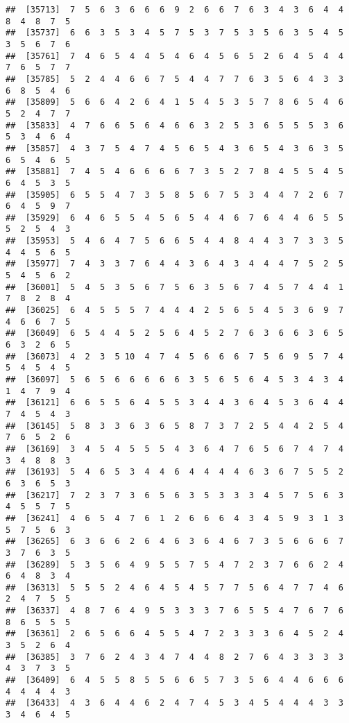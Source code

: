 \documentclass[
]{book}
\begin{document}
\begin{verbatim}
##  [35713]  7  5  6  3  6  6  6  9  2  6  6  7  6  3  4  3  6  4  4  8  4  8  7  5
##  [35737]  6  6  3  5  3  4  5  7  5  3  7  5  3  5  6  3  5  4  5  3  5  6  7  6
##  [35761]  7  4  6  5  4  4  5  4  6  4  5  6  5  2  6  4  5  4  4  7  6  5  7  7
##  [35785]  5  2  4  4  6  6  7  5  4  4  7  7  6  3  5  6  4  3  3  6  8  5  4  6
##  [35809]  5  6  6  4  2  6  4  1  5  4  5  3  5  7  8  6  5  4  6  5  2  4  7  7
##  [35833]  4  7  6  6  5  6  4  6  6  3  2  5  3  6  5  5  5  3  6  5  3  4  6  4
##  [35857]  4  3  7  5  4  7  4  5  6  5  4  3  6  5  4  3  6  3  5  6  5  4  6  5
##  [35881]  7  4  5  4  6  6  6  6  7  3  5  2  7  8  4  5  5  4  5  6  4  5  3  5
##  [35905]  6  5  5  4  7  3  5  8  5  6  7  5  3  4  4  7  2  6  7  6  4  5  9  7
##  [35929]  6  4  6  5  5  4  5  6  5  4  4  6  7  6  4  4  6  5  5  5  2  5  4  3
##  [35953]  5  4  6  4  7  5  6  6  5  4  4  8  4  4  3  7  3  3  5  4  4  5  6  5
##  [35977]  7  4  3  3  7  6  4  4  3  6  4  3  4  4  4  7  5  2  5  5  4  5  6  2
##  [36001]  5  4  5  3  5  6  7  5  6  3  5  6  7  4  5  7  4  4  1  7  8  2  8  4
##  [36025]  6  4  5  5  5  7  4  4  4  2  5  6  5  4  5  3  6  9  7  4  6  6  7  5
##  [36049]  6  5  4  4  5  2  5  6  4  5  2  7  6  3  6  6  3  6  5  6  3  2  6  5
##  [36073]  4  2  3  5 10  4  7  4  5  6  6  6  7  5  6  9  5  7  4  5  4  5  4  5
##  [36097]  5  6  5  6  6  6  6  6  3  5  6  5  6  4  5  3  4  3  4  1  4  7  9  4
##  [36121]  6  6  5  5  6  4  5  5  3  4  4  3  6  4  5  3  6  4  4  7  4  5  4  3
##  [36145]  5  8  3  3  6  3  6  5  8  7  3  7  2  5  4  4  2  5  4  7  6  5  2  6
##  [36169]  3  4  5  4  5  5  5  4  3  6  4  7  6  5  6  7  4  7  4  3  4  8  8  3
##  [36193]  5  4  6  5  3  4  4  6  4  4  4  4  6  3  6  7  5  5  2  6  3  6  5  3
##  [36217]  7  2  3  7  3  6  5  6  3  5  3  3  3  4  5  7  5  6  3  4  5  5  7  5
##  [36241]  4  6  5  4  7  6  1  2  6  6  6  4  3  4  5  9  3  1  3  5  7  5  6  3
##  [36265]  6  3  6  6  2  6  4  6  3  6  4  6  7  3  5  6  6  6  7  3  7  6  3  5
##  [36289]  5  3  5  6  4  9  5  5  7  5  4  7  2  3  7  6  6  2  4  6  4  8  3  4
##  [36313]  5  5  5  2  4  6  4  5  4  5  7  7  5  6  4  7  7  4  6  2  4  7  5  5
##  [36337]  4  8  7  6  4  9  5  3  3  3  7  6  5  5  4  7  6  7  6  8  6  5  5  5
##  [36361]  2  6  5  6  6  4  5  5  4  7  2  3  3  3  6  4  5  2  4  3  5  2  6  4
##  [36385]  3  7  6  2  4  3  4  7  4  4  8  2  7  6  4  3  3  3  3  4  3  7  3  5
##  [36409]  6  4  5  5  8  5  5  6  6  5  7  3  5  6  4  4  6  6  6  4  4  4  4  3
##  [36433]  4  3  6  4  4  6  2  4  7  4  5  3  4  5  4  4  4  3  3  3  4  6  4  5

\end{verbatim}
\end{document}
